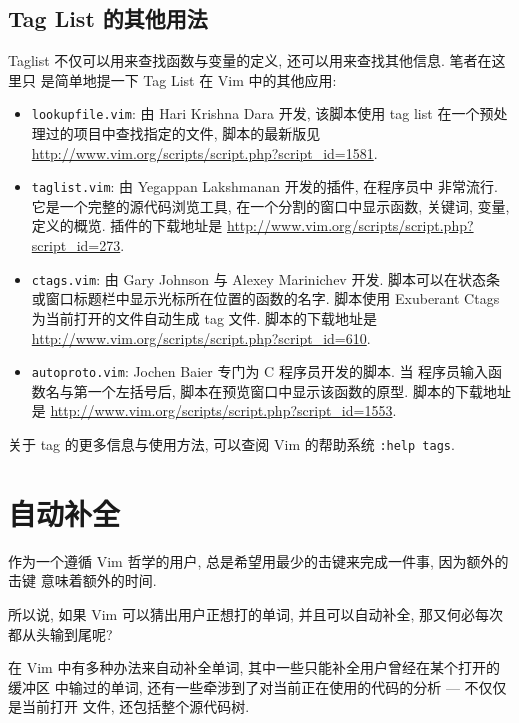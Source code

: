 \subsection{Tag List 的其他用法}
\label{subsec:other_usages_of_taglists}

Taglist 不仅可以用来查找函数与变量的定义, 还可以用来查找其他信息. 笔者在这里只
是简单地提一下 Tag List 在 Vim 中的其他应用:
\begin{itemize}
    \item \texttt{lookupfile.vim}: 由 Hari Krishna Dara 开发, 该脚本使用 tag
        list 在一个预处理过的项目中查找指定的文件, 脚本的最新版见
        \url{http://www.vim.org/scripts/script.php?script_id=1581}.
    \item \texttt{taglist.vim}: 由 Yegappan Lakshmanan 开发的插件, 在程序员中
        非常流行. 它是一个完整的源代码浏览工具, 在一个分割的窗口中显示函数,
        关键词, 变量, 定义的概览. 插件的下载地址是
        \url{http://www.vim.org/scripts/script.php?script_id=273}.
    \item \texttt{ctags.vim}: 由 Gary Johnson 与 Alexey Marinichev 开发.
        脚本可以在状态条或窗口标题栏中显示光标所在位置的函数的名字. 脚本使用
        Exuberant Ctags 为当前打开的文件自动生成 tag 文件. 脚本的下载地址是
        \url{http://www.vim.org/scripts/script.php?script_id=610}.
    \item \texttt{autoproto.vim}: Jochen Baier 专门为 C 程序员开发的脚本. 当
        程序员输入函数名与第一个左括号后, 脚本在预览窗口中显示该函数的原型.
        脚本的下载地址是
        \url{http://www.vim.org/scripts/script.php?script_id=1553}.
\end{itemize}
\begin{warning}
    关于 tag 的更多信息与使用方法, 可以查阅 Vim 的帮助系统 \texttt{:help tags}.
\end{warning}

\section{自动补全}
\label{sec:using_autocompletion}

作为一个遵循 Vim 哲学的用户, 总是希望用最少的击键来完成一件事, 因为额外的击键
意味着额外的时间.

所以说, 如果 Vim 可以猜出用户正想打的单词, 并且可以自动补全, 那又何必每次
都从头输到尾呢?

在 Vim 中有多种办法来自动补全单词, 其中一些只能补全用户曾经在某个打开的缓冲区
中输过的单词, 还有一些牵涉到了对当前正在使用的代码的分析 --- 不仅仅是当前打开
文件, 还包括整个源代码树.


